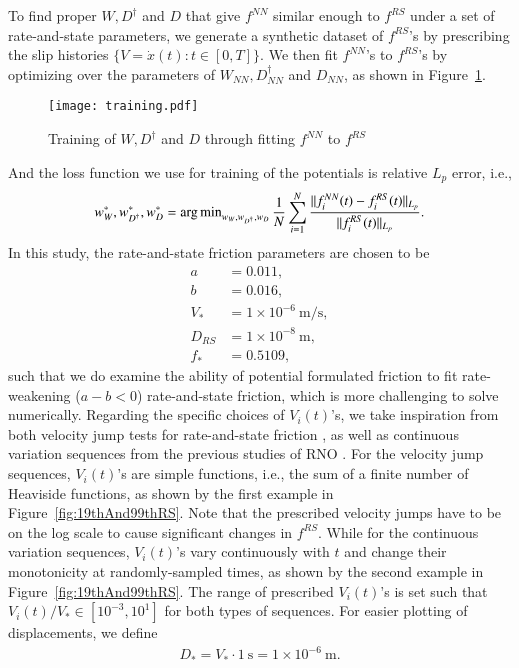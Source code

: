 To find proper $W, D^\dagger$ and $D$ that give $f^{NN}$ similar enough to $f^{RS}$ under a set of rate-and-state parameters, 
we generate a synthetic dataset of $f^{RS}$'s by prescribing the slip histories $\{V = \dot{x}(t) : t \in [0, T]\}$. 
We then fit $f^{NN}$'s to $f^{RS}$'s by optimizing over the parameters of $W_{NN}, D^\dagger_{NN}$ and $D_{NN}$, 
as shown in Figure~\ref{fig:training}. 
\begin{figure}
    \centering
    \texttt{[image: training.pdf]}
    \caption{Training of $W, D^\dagger$ and $D$ through fitting $f^{NN}$ to $f^{RS}$}
    \label{fig:training}
\end{figure}
And the loss function we use for training of the potentials is relative $L_p$ error, 
i.e., 
\begin{align}
    w_W^*, w_{D^\dagger}^*, w_D^* = \operatorname{arg\,min}_{w_W, w_{D^\dagger}, w_D} \frac{1}{N} \sum_{i=1}^N \frac{\|f^{NN}_i(t) - f^{RS}_i(t)\|_{L_p}}{\|f^{RS}_i(t)\|_{L_p}} \label{eq:relativeLpError}. 
\end{align}
In this study, 
the rate-and-state friction parameters are chosen to be 
\begin{align*}
    a &= 0.011, \\
    b &= 0.016, \\
    V_* &= 1\times 10^{-6}\ \mathrm{m/s}, \\
    D_{RS} &= 1\times10^{-8}\ \mathrm{m}, \\
    f_* &= 0.5109,  %
\end{align*}
such that we do examine the ability of potential formulated friction to fit rate-weakening ($a - b < 0$) rate-and-state friction, 
which is more challenging to solve  numerically. 
Regarding the specific choices of $V_i(t)$'s, 
we take inspiration from both velocity jump tests for rate-and-state friction \citep{ruina_slip_1983}, 
as well as continuous variation sequences from the previous studies of RNO \citep{BurigedeEric2023, BurigedeMarkovian2023}. 
For the velocity jump sequences, 
$V_i(t)$'s are simple functions, 
i.e., the sum of a finite number of Heaviside functions, 
as shown by the first example in Figure~{\ref{fig:19thAnd99thRS}}. 
Note that the prescribed velocity jumps have to be on the log scale to cause significant changes in $f^{RS}$.  
While for the continuous variation sequences, 
$V_i(t)$'s vary continuously with $t$ and change their monotonicity at randomly-sampled times, 
as shown by the second example in Figure~\ref{fig:19thAnd99thRS}. 
The range of prescribed $V_i(t)$'s is set such that $V_{i}(t) / V_* \in [10^{-3}, 10^{1}]$ for both types of sequences. 
For easier plotting of displacements, 
we define 
\begin{align*}
    D_* = V_* \cdot 1\ \mathrm{s} = 1\times10^{-6}\ \mathrm{m}. 
\end{align*}


